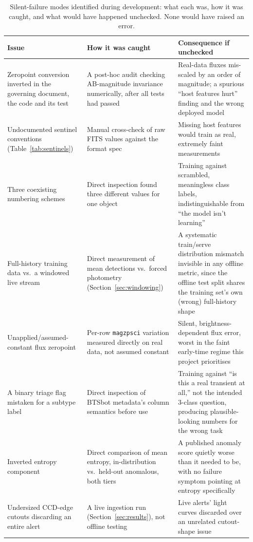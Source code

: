 \begin{table}[htb]
\centering
\caption{Silent-failure modes identified during development: what each was,
how it was caught, and what would have happened unchecked. None would have
raised an error.}
\label{tab:silentfailures}
\scriptsize
\begin{tabular}{L{2.7cm}L{4.6cm}L{5.8cm}}
\toprule
Issue & How it was caught & Consequence if unchecked \\
\midrule
Zeropoint conversion inverted in the governing document, the code and its
  test & A post-hoc audit checking AB-magnitude invariance numerically,
  after all \TestsPassedPreFix{} tests had passed & Real-data fluxes
  mis-scaled by an order of magnitude; a spurious ``host features hurt''
  finding and the wrong deployed model \\
Undocumented sentinel conventions (Table~\ref{tab:sentinels}) & Manual
  cross-check of raw FITS values against the format spec & Missing host
  features would train as real, extremely faint measurements \\
Three coexisting numbering schemes & Direct inspection found three
  different values for one object & Training against scrambled,
  meaningless class labels, indistinguishable from ``the model isn't
  learning'' \\
Full-history training data vs.\ a windowed live stream &
  Direct measurement of mean detections vs.\ forced photometry
  (Section~\ref{sec:windowing}) & A systematic train/serve distribution
  mismatch invisible in any offline metric, since the offline test split
  shares the training set's own (wrong) full-history shape \\
Unapplied/assumed-constant flux zeropoint & Per-row \texttt{magzpsci}
  variation measured directly on real data, not assumed constant &
  Silent, brightness-dependent flux error, worst in the faint early-time
  regime this project prioritises \\
A binary triage flag mistaken for a subtype label & Direct inspection of
  BTSbot metadata's column semantics before use & Training against ``is
  this a real transient at all,'' not the intended 3-class question,
  producing plausible-looking numbers for the wrong task \\
Inverted entropy component & Direct comparison of mean entropy,
  in-distribution vs.\ held-out anomalous, both tiers & A published
  anomaly score quietly worse than it needed to be, with no failure
  symptom pointing at entropy specifically \\
Undersized CCD-edge cutouts discarding an entire alert & A live ingestion
  run (Section~\ref{sec:results}), not offline testing & Live alerts'
  light curves discarded over an unrelated cutout-shape issue \\
\bottomrule
\end{tabular}
\end{table}

